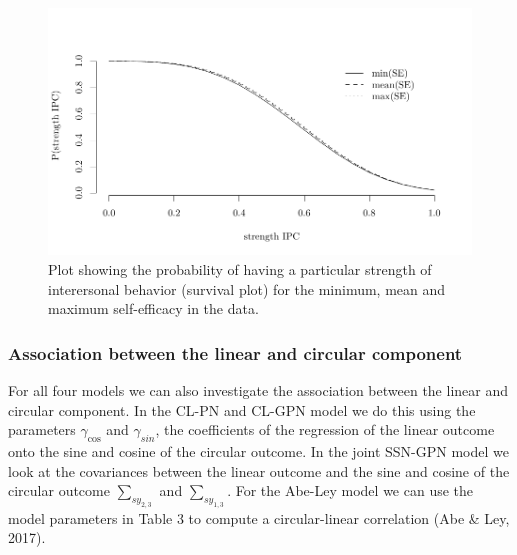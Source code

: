 \documentclass[11pt,]{article}
\begin{document}
\begin{figure}
\centering
\includegraphics[width = \textwidth]{Plots/survivaldiffSE.pdf}
\caption{Plot showing the probability of having a particular strength of interersonal behavior (survival plot) for the minimum, mean and maximum self-efficacy in the data.}
\label{reglineweib}
\end{figure}

\subsubsection{Association between the linear and circular component}

For all four models we can also investigate the association between the
linear and circular component. In the CL-PN and CL-GPN model we do this
using the parameters \(\gamma_{\cos}\) and \(\gamma_{sin}\), the
coefficients of the regression of the linear outcome onto the sine and
cosine of the circular outcome. In the joint SSN-GPN model we look at
the covariances between the linear outcome and the sine and cosine of
the circular outcome \(\sum_{sy_{2,3}}\) and \(\sum_{sy_{1,3}}\). For
the Abe-Ley model we can use the model parameters in Table 3 to compute
a circular-linear correlation (Abe \& Ley, 2017).
\end{document}
